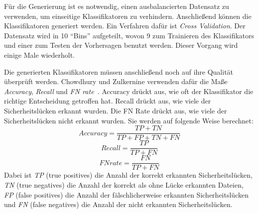 Für die Generierung ist es notwendig, einen ausbalancierten Datensatz zu verwenden, um einseitige Klassifikatoren zu verhindern.
Anschließend können die Klassifikatoren generiert werden.
Ein Verfahren dafür ist \emph{Cross Validation}\cite{chowdhury_zulkernine_2009}.
Der Datensatz wird in 10 "`Bins"' aufgeteilt, wovon 9 zum Trainieren des Klassifikators und einer zum Testen der Vorhersagen benutzt werden.
Dieser Vorgang wird einige Male wiederholt.

Die generierten Klassifikatoren müssen anschließend noch auf ihre Qualität überprüft werden.
Chowdhury und Zulkernine verwenden dafür die Maße \emph{Accuracy}, \emph{Recall} und \emph{FN rate}~\cite{chowdhury_zulkernine_2009}.
Accuracy drückt aus, wie oft der Klassifikator die richtige Entscheidung getroffen hat.
Recall drückt aus, wie viele der Sicherheitslücken erkannt wurden.
Die FN Rate drückt aus, wie viele der Sicherheitslücken nicht erkannt wurden.
Sie werden auf folgende Weise berechnet:
\begin{equation}
	Accuracy = \frac{TP+TN}{TP+FP+TN+FN}
\end{equation}
\begin{equation}
	Recall = \frac{TP}{TP+FN}
\end{equation}
\begin{equation}
	FN rate = \frac{FN}{TP+FN}
\end{equation}
Dabei ist \emph{TP} (true positives) die Anzahl der korrekt erkannten Sicherheitslücken,
\emph{TN} (true negatives) die Anzahl der korrekt als ohne Lücke erkannten Dateien,
\emph{FP} (false positives) die Anzahl der fälschlicherweise erkannten Sicherheitslücken und
\emph{FN} (false negatives) die Anzahl der nicht erkannten Sicherheitslücken.
